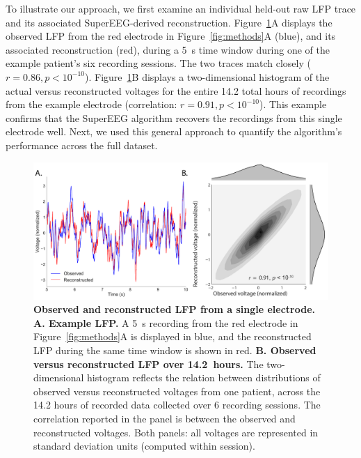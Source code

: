 \documentclass[11pt]{article}
\begin{document}
To illustrate our approach, we first examine an individual held-out
raw LFP trace and its associated SuperEEG-derived reconstruction.
Figure~\ref{fig:recon}A displays the observed LFP from the red
electrode in Figure~\ref{fig:methods}A (blue), and its associated
reconstruction (red), during a 5~s time window during one of the
example patient's six recording sessions.  The two traces match
closely ($r = 0.86, p < 10^{-10}$).  Figure~\ref{fig:recon}B displays a
two-dimensional histogram of the actual versus reconstructed voltages
for the entire 14.2 total hours of recordings from the example
electrode (correlation: $r = 0.91, p < 10^{-10}$).  This example confirms
that the SuperEEG algorithm recovers the recordings from this single
electrode well.  Next, we used this general approach to quantify the
algorithm's performance across the full dataset.

\begin{figure}
  \centering
  \includegraphics[width=\textwidth]{figs/recon}
  \caption{\textbf{Observed and reconstructed LFP from a single
      electrode.} \textbf{A. Example LFP.}  A 5~s recording from the
    red electrode in Figure~\ref{fig:methods}A is displayed in blue,
    and the reconstructed LFP during the same time window is shown in
    red.  \textbf{B. Observed versus reconstructed LFP over
      14.2~hours.}  The two-dimensional histogram reflects the
    relation between distributions of observed versus reconstructed
    voltages from one patient, across the 14.2 hours of recorded data
    collected over 6 recording sessions.  The correlation reported in
    the panel is between the observed and reconstructed voltages.
    Both panels: all voltages are represented in standard deviation units
   (computed within session).}
  \label{fig:recon}
\end{figure}
\end{document}

